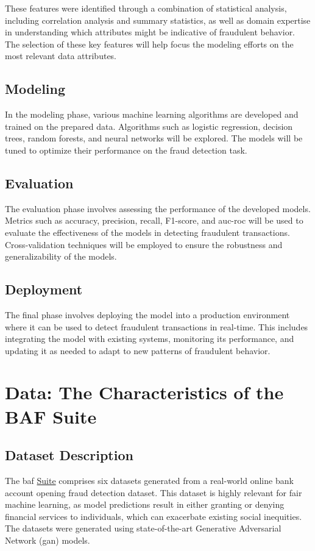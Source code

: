 \documentclass[12pt,a4paper]{report}
\begin{document}
These features were identified through a combination of statistical analysis, including correlation analysis and summary statistics, as well as domain expertise in understanding which attributes might be indicative of fraudulent behavior. The selection of these key features will help focus the modeling efforts on the most relevant data attributes.




\subsection{Modeling}
In the modeling phase, various machine learning algorithms are developed and trained on the prepared data. Algorithms such as logistic regression, decision trees, random forests, and neural networks will be explored. The models will be tuned to optimize their performance on the fraud detection task.

\subsection{Evaluation}
The evaluation phase involves assessing the performance of the developed models. Metrics such as accuracy, precision, recall, F1-score, and \acrshort{auc}-\acrshort{roc} will be used to evaluate the effectiveness of the models in detecting fraudulent transactions. Cross-validation techniques will be employed to ensure the robustness and generalizability of the models.

\subsection{Deployment}
The final phase involves deploying the model into a production environment where it can be used to detect fraudulent transactions in real-time. This includes integrating the model with existing systems, monitoring its performance, and updating it as needed to adapt to new patterns of fraudulent behavior.








\section{Data: The Characteristics of the BAF Suite}
\subsection{Dataset Description}
The \acrshort{baf} \href{https://www.kaggle.com/datasets/sgpjesus/bank-account-fraud-dataset-neurips-2022/code}{Suite} comprises six datasets generated from a real-world online bank account opening fraud detection dataset. This dataset is highly relevant for fair machine learning, as model predictions result in either granting or denying financial services to individuals, which can exacerbate existing social inequities. The datasets were generated using state-of-the-art Generative Adversarial Network (\acrshort{gan}) models.
\end{document}
